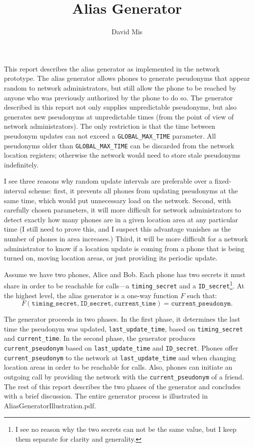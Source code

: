 \documentclass[11pt]{article}
\begin{document}
\title{Alias Generator}
\author{David Mis}

\maketitle

This report describes the alias generator as implemented in the network prototype. The alias generator allows phones to generate pseudonyms that appear random to network administrators, but still allow the phone to be reached by anyone who was previously authorized by the phone to do so. The generator described in this report not only supplies unpredictable pseudonyms, but also generates new pseudonyms at unpredictable times (from the point of view of network administrators). The only restriction is that the time between pseudonym updates can not exceed a \texttt{GLOBAL_MAX_TIME} parameter. All pseudonyms older than \texttt{GLOBAL_MAX_TIME} can be discarded from the network location registers; otherwise the network would need to store stale pseudonyms indefinitely. 

I see three reasons why random update intervals are preferable over a fixed-interval scheme: first, it prevents all phones from updating pseudonyms at the same time, which would put unnecessary load on the network. Second, with carefully chosen parameters, it will more difficult for network administrators to detect exactly how many phones are in a given location area at any particular time (I still need to prove this, and I suspect this advantage vanishes as the number of phones in area increases.) Third, it will be more difficult for a network administrator to know if a location update is coming from a phone that is being turned on, moving location areas, or just providing its periodic update. 

Assume we have two phones, Alice and Bob. Each phone has two secrets it must share in order to be reachable for calls---a \texttt{timing_secret} and a \texttt{ID_secret}\footnote{I see no reason why the two secrets can not be the same value, but I keep them separate for clarity and generality.}. At the highest level, the alias generator is a one-way function $F$ such that:
\begin{equation*}
	F(\texttt{timing_secret}, \texttt{ID_secret}, \texttt{current_time}) = \texttt{current_pseudonym}.
\end{equation*}

The generator proceeds in two phases. In the first phase, it determines the last time the pseudonym was updated, \texttt{last_update_time}, based on \texttt{timing_secret} and \texttt{current_time}. In the second phase, the generator produces \texttt{current_pseudonym} based on \texttt{last_update_time} and \texttt{ID_secret}. Phones offer \texttt{current_pseudonym} to the network at \texttt{last_update_time} and when changing location areas in order to be reachable for calls. Also, phones can initiate an outgoing call by providing the network with the \texttt{current_pseudonym} of a friend. The rest of this report describes the two phases of the generator and concludes with a brief discussion. The entire generator process is illustrated in AliasGeneratorIllustration.pdf.
\end{document}
